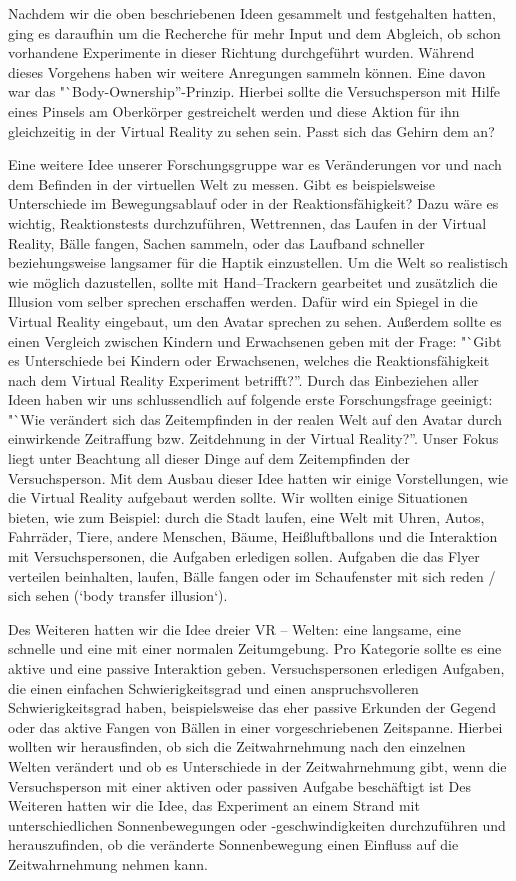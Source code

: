 \documentclass{Bericht}
\begin{document}
	Nachdem wir die oben beschriebenen Ideen gesammelt und festgehalten hatten, ging es daraufhin um die Recherche für mehr Input und dem Abgleich, ob schon vorhandene Experimente in dieser Richtung durchgeführt wurden. Während dieses Vorgehens haben wir weitere Anregungen sammeln können. Eine davon war das "`Body-Ownership''-Prinzip. Hierbei sollte die Versuchsperson mit Hilfe eines Pinsels am Oberkörper gestreichelt werden und diese Aktion für ihn gleichzeitig in der Virtual Reality zu sehen sein. 
Passt sich das Gehirn dem an? 

Eine weitere Idee unserer Forschungsgruppe war es Veränderungen vor und nach dem Befinden in der virtuellen Welt zu messen. 
Gibt es beispielsweise Unterschiede im Bewegungsablauf oder in der Reaktionsfähigkeit? Dazu wäre es wichtig, Reaktionstests durchzuführen, Wettrennen, das Laufen in der Virtual Reality, Bälle fangen, Sachen sammeln, oder das Laufband schneller beziehungsweise langsamer für die Haptik einzustellen. Um die Welt so realistisch wie möglich dazustellen, sollte mit Hand–Trackern gearbeitet und zusätzlich die Illusion vom selber sprechen erschaffen werden. Dafür wird ein Spiegel in die Virtual Reality eingebaut, um den Avatar sprechen zu sehen. Außerdem sollte es einen Vergleich zwischen Kindern und Erwachsenen geben mit der Frage: "`Gibt es Unterschiede bei Kindern oder Erwachsenen, welches die Reaktionsfähigkeit nach dem Virtual Reality Experiment betrifft?''. Durch das Einbeziehen aller Ideen haben wir uns schlussendlich auf folgende erste Forschungsfrage geeinigt: "`Wie verändert sich das Zeitempfinden in der realen Welt auf den Avatar durch einwirkende Zeitraffung bzw. Zeitdehnung in der Virtual Reality?''. Unser Fokus liegt unter Beachtung all dieser Dinge auf dem Zeitempfinden der Versuchsperson. Mit dem Ausbau dieser Idee hatten wir einige Vorstellungen, wie die Virtual Reality aufgebaut werden sollte. Wir wollten einige Situationen bieten, wie zum Beispiel: durch die Stadt laufen, eine Welt mit Uhren, Autos, Fahrräder, Tiere, andere Menschen, Bäume, Heißluftballons und die Interaktion mit Versuchspersonen, die Aufgaben erledigen sollen. Aufgaben die das Flyer verteilen beinhalten, laufen, Bälle fangen oder im Schaufenster mit sich reden / sich sehen (‘body transfer illusion‘).

	Des Weiteren hatten wir die Idee dreier VR – Welten: eine langsame, eine schnelle und eine mit einer normalen Zeitumgebung. Pro Kategorie sollte es eine aktive und eine passive Interaktion geben. Versuchspersonen erledigen Aufgaben, die einen einfachen Schwierigkeitsgrad und einen anspruchsvolleren Schwierigkeitsgrad haben, beispielsweise das eher passive Erkunden der Gegend oder das aktive Fangen von Bällen in einer vorgeschriebenen Zeitspanne. Hierbei wollten wir herausfinden, ob sich die Zeitwahrnehmung nach den einzelnen Welten verändert und ob es Unterschiede in der Zeitwahrnehmung gibt, wenn die Versuchsperson mit einer aktiven oder passiven Aufgabe beschäftigt ist  Des Weiteren hatten wir die Idee, das Experiment an einem Strand mit unterschiedlichen Sonnenbewegungen oder -geschwindigkeiten durchzuführen und herauszufinden, ob die veränderte Sonnenbewegung einen Einfluss auf die Zeitwahrnehmung nehmen kann.  
\end{document}
